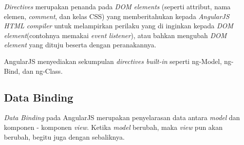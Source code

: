 		\textit{Directives} merupakan penanda pada \textit{DOM elements} (seperti attribut, nama elemen, \textit{comment},  dan kelas CSS) yang memberitahukan kepada \textit{AngularJS HTML compiler} untuk melampirkan perilaku yang di inginkan kepada \textit{DOM element}(contohnya memakai \textit{event listener}), atau bahkan mengubah \textit{DOM element} yang dituju beserta dengan peranakannya.
		
		AngularJS menyediakan sekumpulan \textit{directives built-in} seperti ng-Model, ng-Bind, dan ng-Class. 
		
	
	
	\subsection{Data Binding}
	\label{sub: dataBinding}
		
		\textit{Data Binding} pada AngularJS merupakan penyelarasan data antara \textit{model} dan komponen - komponen \textit{view}. Ketika \textit{model} berubah, maka \textit{view} pun akan berubah, begitu juga dengan sebaliknya.
		
